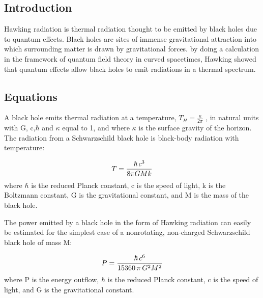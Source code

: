 
\subsection{Introduction}

Hawking radiation is thermal radiation thought to be emitted by black holes due to quantum effects. Black holes are sites of immense gravitational attraction into which surrounding matter is drawn by gravitational forces.
by doing a calculation in the framework of quantum field theory in curved spacetimes, Hawking showed that quantum effects allow black holes to emit radiations in a thermal spectrum.

\subsection{Equations}

A black hole emits thermal radiation at a temperature, $ T_H = \frac{\kappa}{2 \pi} $ , 
in natural units with G, c,$ \hbar $ and $ \kappa $  equal to 1, and where $ \kappa $  is the surface gravity of the horizon.\\

The radiation from a Schwarzschild black hole is black-body radiation with temperature:

$$ T={\hbar\,c^3\over8\pi G M k} $$
where $ \hbar $ is the reduced Planck constant, c is the speed of light, k is the Boltzmann constant, G is the gravitational constant, and M is the mass of the black hole.

The power emitted by a black hole in the form of Hawking radiation can easily be estimated for the simplest case of a nonrotating, non-charged Schwarzschild black hole of mass M:

$$ P={\hbar\,c^6\over15360\,\pi\,G^2M^2} $$
where P is the energy outflow, $ \hbar $  is the reduced Planck constant, c is the speed of light, and G is the gravitational constant.


